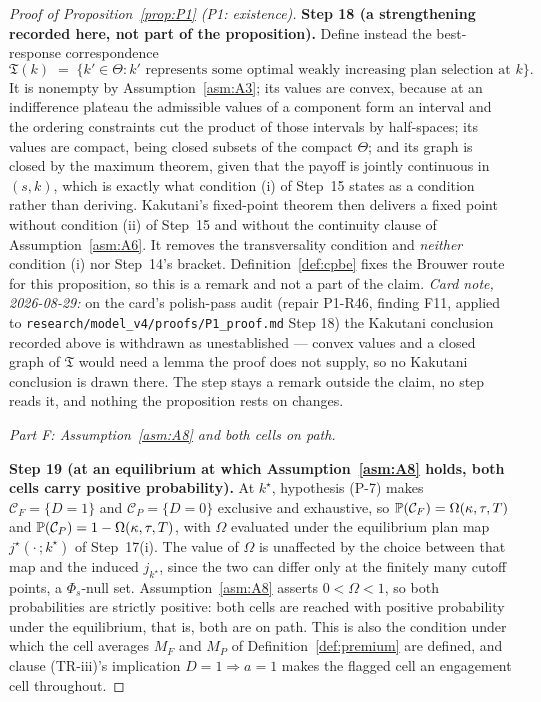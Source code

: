 \begin{proof}[Proof of Proposition~\ref{prop:P1} (P1: existence)]
\smallskip
\noindent\textbf{Step 18 (a strengthening recorded here, not part of the proposition).}
Define instead the best-response correspondence
\[
\mathfrak T(k) \;=\; \bigl\{k' \in \Theta : k' \text{ represents some optimal weakly increasing plan
selection at } k\bigr\}.
\]
It is nonempty by Assumption~\ref{asm:A3}; its values are convex, because at an
indifference plateau the admissible values of a component form an interval and the ordering
constraints cut the product of those intervals by half-spaces; its values are compact, being closed
subsets of the compact $\Theta$; and its graph is closed by the maximum theorem, given that the
payoff is jointly continuous in $(s,k)$, which is exactly what condition (i) of Step~15 states as a
condition rather than deriving. Kakutani's fixed-point theorem then delivers a fixed point without
condition (ii) of Step~15 and without the continuity clause of Assumption~\ref{asm:A6}. It removes
the transversality condition and \emph{neither} condition (i) nor Step~14's bracket.
Definition~\ref{def:cpbe} fixes the Brouwer route for this proposition, so this is a remark and not a
part of the claim. \emph{Card note, 2026-08-29:} on the card's polish-pass audit (repair P1-R46,
finding F11, applied to \texttt{research/model\_v4/proofs/P1\_proof.md} Step 18) the Kakutani
conclusion recorded above is withdrawn as unestablished --- convex values and a closed graph of
$\mathfrak T$ would need a lemma the proof does not supply, so no Kakutani conclusion is drawn
there. The step stays a remark outside the claim, no step reads it, and nothing the proposition
rests on changes.

\medskip
\noindent\emph{Part F: Assumption~\ref{asm:A8} and both cells on path.}

\smallskip
\noindent\textbf{Step 19 (at an equilibrium at which Assumption~\ref{asm:A8} holds, both cells carry
positive probability).}
At $k^\star$, hypothesis (P-7) makes $\mathcal C_F = \{D=1\}$ and $\mathcal C_P = \{D=0\}$ exclusive
and exhaustive, so $\mathbb{P}(\mathcal C_F) = \Omega(\kappa,\tau,T)$ and
$\mathbb{P}(\mathcal C_P) = 1-\Omega(\kappa,\tau,T)$, with $\Omega$ evaluated under the equilibrium plan
map $j^\star(\cdot\,;k^\star)$ of Step~17(i). The value of $\Omega$ is unaffected by the choice
between that map and the induced $j_{k^\star}$, since the two can differ only at the finitely many
cutoff points, a $\Phi_s$-null set. Assumption~\ref{asm:A8} asserts $0 < \Omega < 1$, so both
probabilities are strictly positive: both cells are reached with positive probability under the
equilibrium, that is, both are on path. This is also the condition under which the cell averages
$M_F$ and $M_P$ of Definition~\ref{def:premium} are defined, and clause (TR-iii)'s implication
$D = 1 \Rightarrow a = 1$ makes the flagged cell an engagement cell throughout.


\end{proof}
